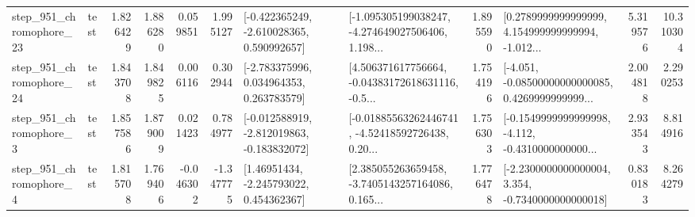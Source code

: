 \begin{tabular}{llrrrrllrlrr}
  step\_951\_chromophore\_23 &      test &      1.826429 &    1.886280 &      0.059851 &  1.995127 &   [-0.422365249, -2.610028365, 0.590992657] &  [-1.095305199038247, -4.274649027506406, 1.198... &       1.895590 &  [0.2789999999999999, 4.154999999999994, -1.012... &            5.319576 &         10.310304 \\
  step\_951\_chromophore\_24 &      test &      1.843708 &    1.849825 &      0.006116 &  0.302944 &    [-2.783375996, 0.034964353, 0.263783579] &  [4.506371617756664, -0.04383172618631116, -0.5... &       1.754196 &  [-4.051, -0.08500000000000085, 0.4269999999999... &            2.004818 &          2.290253 \\
   step\_951\_chromophore\_3 &      test &      1.857586 &    1.879009 &      0.021423 &  0.784977 &  [-0.012588919, -2.812019863, -0.183832072] &  [-0.01885563262446741, -4.52418592726438, 0.20... &       1.756303 &  [-0.1549999999999998, -4.112, -0.4310000000000... &            2.933543 &          8.814916 \\
   step\_951\_chromophore\_4 &      test &      1.815708 &    1.769406 &     -0.046302 & -1.347775 &     [1.46951434, -2.245793022, 0.454362367] &  [2.385055263659458, -3.7405143257164086, 0.165... &       1.776478 &  [-2.2300000000000004, 3.354, -0.7340000000000018] &            0.830183 &          8.264279 \\
\bottomrule
\end{tabular}

